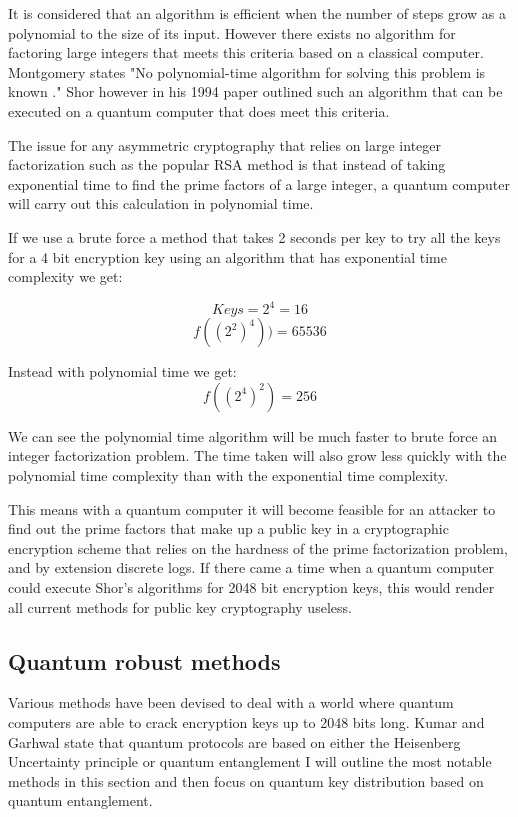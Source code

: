 \documentclass{article}
\begin{document}
It is considered that an algorithm is efficient when the number of steps grow as a polynomial to the size of its input. \cite{Shor1994AlgorithmsFactoring}  However there exists no algorithm for factoring large integers that meets this criteria based on a classical computer. Montgomery \cite{Montgomery1994AAlgorithms} states "No polynomial-time algorithm for solving this problem is known ."  Shor however in his 1994 paper  outlined  \cite{Shor1994AlgorithmsFactoring} such an algorithm that can be executed on a quantum computer that does meet this criteria. 

The issue for any asymmetric cryptography that relies on large integer factorization such as the popular RSA method is that instead of taking exponential time to find the prime factors of a large integer, a quantum computer will carry out this calculation in polynomial time. 

If we use a brute force a method that takes 2 seconds per key to try all the keys for a 4 bit encryption key using an algorithm that has exponential time complexity we get:

\[Keys = 2^4 = 16\]
\[f((2^2)^4)) = 65536\]


Instead with polynomial time we get:
\[f((2^4)^2) = 256\]

We can see the polynomial time algorithm will be much faster to brute force an integer factorization problem. The time taken will also grow less quickly with the polynomial time complexity than with the exponential time complexity.

This means with a quantum computer it will become feasible for an attacker to find out the prime factors that make up a public key in a cryptographic encryption scheme that relies on the hardness of the prime factorization problem, and by extension discrete logs. If there came a time when a quantum computer could execute Shor's algorithms for 2048 bit encryption keys, this would render all current methods for public key cryptography useless.

\subsection{Quantum robust methods}
Various methods have been devised to deal with a world where quantum computers are able to crack encryption keys up to 2048 bits long. Kumar and Garhwal state that quantum protocols are based on either the Heisenberg Uncertainty principle or quantum entanglement \cite{Kumar2021State-of-the-ArtCryptography} I will outline the most notable methods in this section and then focus on quantum key distribution based on quantum entanglement. 
\end{document}
